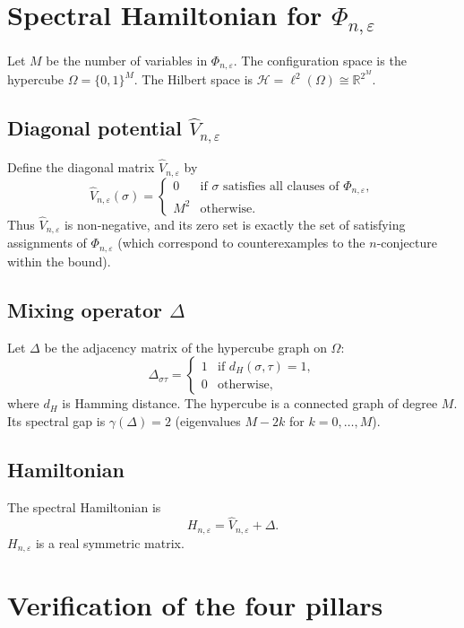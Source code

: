 \documentclass[11pt,a4paper]{article}
\begin{document}
\section{Spectral Hamiltonian for $\Phi_{n,\varepsilon}$}

Let $M$ be the number of variables in $\Phi_{n,\varepsilon}$. The configuration space is the hypercube $\Omega = \{0,1\}^M$. The Hilbert space is $\mathcal{H} = \ell^2(\Omega) \cong \mathbb{R}^{2^M}$.

\subsection{Diagonal potential $\hat{V}_{n,\varepsilon}$}
Define the diagonal matrix $\hat{V}_{n,\varepsilon}$ by
\[
\hat{V}_{n,\varepsilon}(\sigma) = \begin{cases}
0 & \text{if }\sigma\text{ satisfies all clauses of } \Phi_{n,\varepsilon},\\
M^2 & \text{otherwise}.
\end{cases}
\]
Thus $\hat{V}_{n,\varepsilon}$ is non‑negative, and its zero set is exactly the set of satisfying assignments of $\Phi_{n,\varepsilon}$ (which correspond to counterexamples to the $n$-conjecture within the bound).

\subsection{Mixing operator $\Delta$}
Let $\Delta$ be the adjacency matrix of the hypercube graph on $\Omega$:
\[
\Delta_{\sigma\tau} = \begin{cases}
1 & \text{if } d_H(\sigma,\tau)=1,\\
0 & \text{otherwise},
\end{cases}
\]
where $d_H$ is Hamming distance. The hypercube is a connected graph of degree $M$. Its spectral gap is $\gamma(\Delta)=2$ (eigenvalues $M-2k$ for $k=0,\dots,M$).

\subsection{Hamiltonian}
The spectral Hamiltonian is
\[
H_{n,\varepsilon} = \hat{V}_{n,\varepsilon} + \Delta.
\]
$H_{n,\varepsilon}$ is a real symmetric matrix.

\section{Verification of the four pillars}
\end{document}
